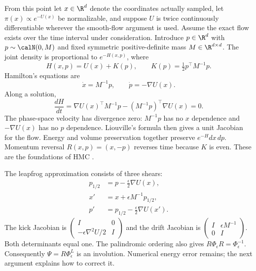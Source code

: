 From this point let $x\in\R^d$ denote the coordinates actually sampled,
let $\pi(x)\propto e^{-U(x)}$ be normalizable, and suppose $U$ is twice
continuously differentiable wherever the smooth-flow argument is used.
Assume the exact flow exists over the time interval under consideration.
Introduce $p\in\R^d$ with $p\sim\calN(0,M)$ and fixed symmetric
positive-definite mass $M\in\R^{d\times d}$. The joint density
is proportional to $e^{-H(x,p)}$, where
\begin{equation}
 H(x,p)=U(x)+K(p),\qquad K(p)=\tfrac12p^\top M^{-1}p.
 \label{eq:bf-modern-hamiltonian}
\end{equation}
Hamilton's equations are
\begin{equation}
 \dot x=M^{-1}p,\qquad \dot p=-\nabla U(x).
 \label{eq:bf-modern-hamilton-equations}
\end{equation}
Along a solution,
\begin{equation}
 \frac{dH}{dt}=\nabla U(x)^\top M^{-1}p
               -(M^{-1}p)^\top\nabla U(x)=0.
 \label{eq:bf-modern-energy-conservation}
\end{equation}
The phase-space velocity has divergence zero: $M^{-1}p$ has no $x$
dependence and $-\nabla U(x)$ has no $p$ dependence. Liouville's formula
then gives a unit Jacobian for the flow. Energy and volume preservation
together preserve $e^{-H}dx\,dp$. Momentum reversal
$R(x,p)=(x,-p)$ reverses time because $K$ is even. These are the foundations
of HMC \citep[Sections 2 and 3]{neal2011mcmc}.

The leapfrog approximation consists of three shears:
\begin{align}
 p_{1/2}&=p-\tfrac\epsilon2\nabla U(x),\\
 x'&=x+\epsilon M^{-1}p_{1/2},\\
 p'&=p_{1/2}-\tfrac\epsilon2\nabla U(x').
 \label{eq:bf-modern-leapfrog}
\end{align}
The kick Jacobian is
$\left(\begin{smallmatrix}I&0\\-\epsilon\nabla^2U/2&I\end{smallmatrix}\right)$
and the drift Jacobian is
$\left(\begin{smallmatrix}I&\epsilon M^{-1}\\0&I\end{smallmatrix}\right)$.
Both determinants equal one. The palindromic ordering also gives
$R\Phi_\epsilon R=\Phi_\epsilon^{-1}$. Consequently
$\Psi=R\Phi_\epsilon^L$ is an involution. Numerical energy error remains;
the next argument explains how to correct it.

